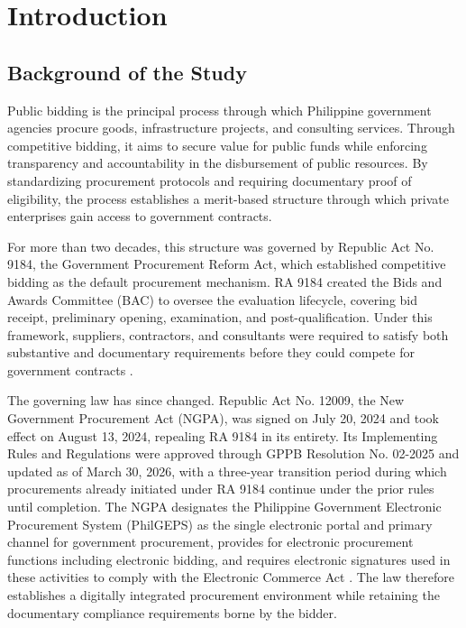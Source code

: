 \chapter{Introduction}
\label{ch:introduction}

\section{Background of the Study}
\label{sec:background_of_study}
Public bidding is the principal process through which Philippine government agencies procure goods, infrastructure projects, and consulting services.
Through competitive bidding, it aims to secure value for public funds while enforcing transparency and accountability in the disbursement of public resources.
By standardizing procurement protocols and requiring documentary proof of eligibility, the process establishes a merit-based structure through which private enterprises gain access to government contracts.

For more than two decades, this structure was governed by Republic Act No. 9184, the Government Procurement Reform Act, which established competitive bidding as the default procurement mechanism.
RA 9184 created the Bids and Awards Committee (BAC) to oversee the evaluation lifecycle, covering bid receipt, preliminary opening, examination, and post-qualification.
Under this framework, suppliers, contractors, and consultants were required to satisfy both substantive and documentary requirements before they could compete for government contracts \cite{ref1}.

The governing law has since changed.
Republic Act No. 12009, the New Government Procurement Act (NGPA), was signed on July 20, 2024 and took effect on August 13, 2024, repealing RA 9184 in its entirety.
Its Implementing Rules and Regulations were approved through GPPB Resolution No. 02-2025 and updated as of March 30, 2026, with a three-year transition period during which procurements already initiated under RA 9184 continue under the prior rules until completion.
The NGPA designates the Philippine Government Electronic Procurement System (PhilGEPS) as the single electronic portal and primary channel for government procurement, provides for electronic procurement functions including electronic bidding, and requires electronic signatures used in these activities to comply with the Electronic Commerce Act \cite{ref2}.
The law therefore establishes a digitally integrated procurement environment while retaining the documentary compliance requirements borne by the bidder.

